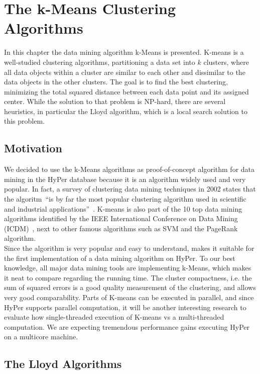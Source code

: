 \chapter{The k-Means Clustering Algorithms}\label{chapter:kmeans}

In this chapter the data mining algorithm k-Means is presented. K-means is a well-studied clustering algorithms, partitioning a data set into $k$ clusters, where all data objects within a cluster are similar to each other and dissimilar to the data objects in the other clusters. The goal is to find the best clustering, minimizing the total squared distance between each data point and its assigned center. While the solution to that problem is NP-hard, there are several heuristics, in particular the Lloyd algorithm, which is a local search solution to this problem.

\section{Motivation}
 
We decided to use the k-Means algorithms as proof-of-concept algorithm for data mining in the HyPer database because it is an algorithm widely used and very popular. In fact, a survey of clustering data mining techniques in 2002 states that the algoritm~\enquote{is by far the most popular clustering algorithm used in scientific and industrial applications}~\parencite{berkhin2002survey}. K-means is also part of the 10 top data mining algorithms identified by the IEEE International Conference on Data Mining (ICDM)~\parencite{top10}, next to other famous algorithms such as SVM and the PageRank algorithm. 
\\
Since the algorithm is very popular and easy to understand, makes it suitable for the first implementation of a data mining algorithm on HyPer. To our best knowledge, all major data mining tools are implementing k-Means, which makes it neat to compare regarding the running time. The cluster compactness, i.e. the sum of squared errors is a good quality measurement of the clustering, and allows very good comparability. 
Parts of K-means can be executed in parallel, and since HyPer supports parallel computation, it will be another interesting research to evaluate how single-threaded execution of K-means vs a multi-threaded computation. We are expecting tremendous performance gains executing HyPer on a multicore machine.

\section{The Lloyd Algorithms}

